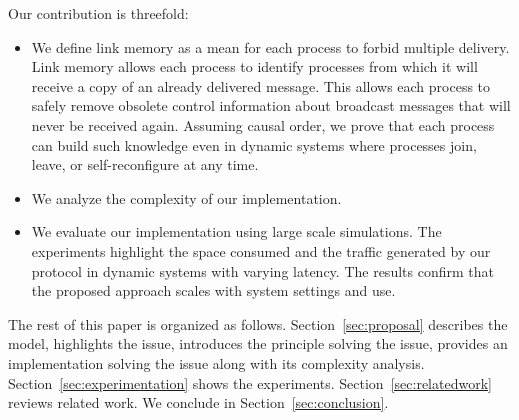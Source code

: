 Our contribution is threefold:
\begin{itemize}[leftmargin=*]
\item We define link memory as a mean for each process to forbid multiple
  delivery. 
  Link memory allows each process to identify processes from which it
  will receive a copy of an already delivered message. This allows each process
  to safely remove obsolete control information about broadcast messages that
  will never be received again. Assuming causal order, we prove that each
  process can build such knowledge even in dynamic systems where processes join,
  leave, or self-reconfigure at any time.
\item We analyze the complexity of our implementation.
\item We evaluate our implementation using large scale simulations. The
  experiments highlight the space consumed and the traffic generated by our
  protocol in dynamic systems with varying latency. The results confirm that the
  proposed approach scales with system settings and use.
\end{itemize}

The rest of this paper is organized as follows.
Section~\ref{sec:proposal} describes the model, highlights the issue, introduces
the principle solving the issue, provides an implementation solving the issue
along with its complexity analysis. Section~\ref{sec:experimentation} shows the
experiments. Section~\ref{sec:relatedwork} reviews related work. We conclude in
Section~\ref{sec:conclusion}.


